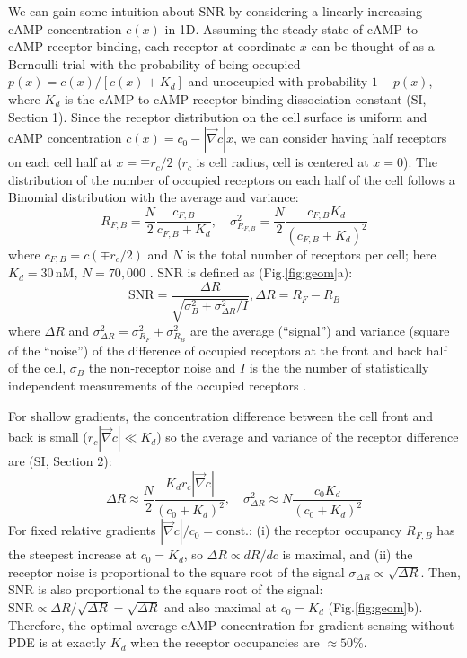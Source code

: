 \documentclass[%
 reprint,
 amsmath,amssymb,
 aps,prl,
 showpacs,
 linenumbers
]{revtex4-1}
\begin{document}
We can gain some intuition about SNR by considering a linearly increasing cAMP concentration $c(x)$ in 1D.  
Assuming the steady state of cAMP to cAMP-receptor binding, each receptor at coordinate $x$ can be thought of as a Bernoulli trial with the probability of being occupied $p(x) = c(x)/[c(x) + K_d]$ and unoccupied with probability $1-p(x)$, where $K_{d}$ is the cAMP to cAMP-receptor binding dissociation constant (SI, Section 1).
Since the receptor distribution on the cell surface is uniform \cite{uniform_receptor_distribution} and cAMP concentration $c(x) = c_0 -|\vec{\nabla} c|x$, we can consider having half receptors on each cell half at $x = \mp r_c/2$ ($r_c$ is cell radius, cell is centered at $x=0$). The distribution of the number of occupied receptors on each half of the cell follows a Binomial distribution with the average and variance:
\begin{equation}
	R_{F,B} = \frac{N}{2} \frac{c_{F,B}}{c_{F,B} + K_d},\quad
	\sigma_{R_{F,B}}^{2}= \frac{N}{2} \frac{c_{F,B} K_d}{(c_{F,B} + K_d)^2}
	\label{eq:RFB}
\end{equation}
where $c_{F,B} = c(\mp r_c/2)$ and $N$ is the total number of receptors per cell; here $K_d=30\,\mathrm{nM}$, $N=70,000$ \cite{RtKdcAR1}. 
SNR is defined as \cite{SNRvh, rappelherbie2} (Fig.\ref{fig:geom}a):
\begin{equation}
	\mathrm{SNR}=\frac{\Delta R}{\sqrt{\sigma_B^2+\sigma_{\Delta R}^2/I}}, \Delta R = R_F-R_B
	\label{eq:SNRdef}
\end{equation}
where $\Delta R$ and $\sigma_{\Delta R}^2 = \sigma_{R_F}^2 + \sigma_{R_B}^2$ are the average (``signal'') and variance (square of the ``noise'') of the difference of occupied receptors at the front and back half of the cell, $\sigma_B$ the non-receptor noise and $I$ is the the number of statistically independent measurements of the occupied receptors \cite{SNRvh}.

For shallow gradients, the concentration difference between the cell front and back is small ($r_c |\vec{\nabla} c| \ll K_d$) so the average and variance of the receptor difference are (SI, Section 2):
\begin{equation}
	\Delta R \approx \frac{N}{2}\frac{K_d r_c |\vec{\nabla} c|}{\left(c_0 + K_d\right)^2},\quad 
	\sigma_{\Delta R}^2 \approx N \frac{c_0 K_d}{\left(c_0 + K_d\right)^2}
	\label{eq:signal_noise_def}
\end{equation}
For fixed relative gradients $|\vec{\nabla} c|/c_0 = \mathrm{const.}$: (i)  the receptor occupancy $R_{F,B}$ has the steepest increase at $c_0=K_d$, so $\Delta R \propto dR/dc$ is maximal, and (ii) the receptor noise is proportional to the square root of the signal $\sigma_{\Delta R} \propto \sqrt{\Delta R}$. Then, SNR is also proportional to the square root of the signal: $\mathrm{SNR} \propto \Delta R/ \sqrt{\Delta R} = \sqrt{\Delta R}$ and also maximal at $c_0 = K_d$ (Fig.\ref{fig:geom}b). Therefore, the optimal average cAMP concentration for gradient sensing without PDE is at exactly $K_d$ when the receptor occupancies are $\approx 50\%$.
\end{document}
